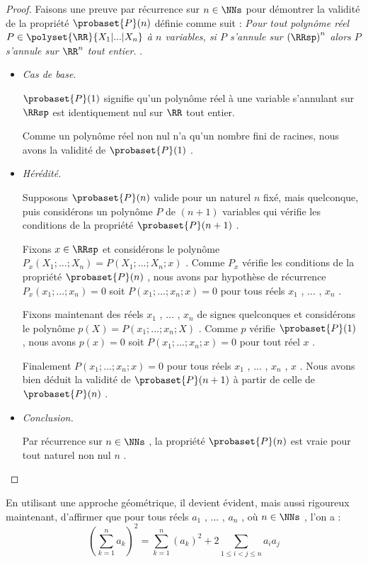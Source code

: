 \begin{proof}
	Faisons une preuve par récurrence sur $n \in \NNs$ pour démontrer la validité de la propriété $\probaset{P}(n)$ définie comme suit :
	\emph{\og 
		Pour tout polynôme réel $P \in \polyset{\RR}{X_1 | ... | X_n}$ à $n$ variables,
		si $P$ s'annule sur $\left( \RRsp \right)^n$ alors $P$ s'annule sur $\RR^n$ tout entier. 
	\fg}.

	\begin{itemize}[label=\small\textbullet]
		\item \emph{Cas de base.}
	
		\noindent
		$\probaset{P}(1)$ signifie qu'un polynôme réel à une variable s'annulant sur $\RRsp$ est identiquement nul sur $\RR$ tout entier.
		
		\smallskip
		\noindent
		Comme un polynôme réel non nul n'a qu'un nombre fini de racines, nous avons la validité de $\probaset{P}(1)$ .


		\medskip
		\item \emph{Hérédité.}
	
		\noindent
		Supposons $\probaset{P}(n)$ valide pour un naturel $n$ fixé, mais quelconque, puis considérons un polynôme $P$ de $(n + 1)$ variables qui vérifie les conditions de la propriété $\probaset{P}(n + 1)$ .
	
		\smallskip
		\noindent
		Fixons $x \in \RRsp$ et considérons le polynôme $P_x(X_1 ; ... ; X_n) = P(X_1 ; ... ; X_n ; x)$ .
		Comme $P_x$  vérifie les conditions de la propriété $\probaset{P}(n)$ ,
		nous avons par hypothèse de récurrence 
		$P_x(x_1 ; ... ; x_n) = 0$ soit $P(x_1 ; ... ; x_n ; x) = 0$ pour tous réels $x_1$ , ... , $x_n$ .
	
		\smallskip
		\noindent
		Fixons maintenant des réels $x_1$ , ... , $x_n$ de signes quelconques et considérons le polynôme $p(X) = P(x_1 ; ... ; x_n ; X)$ .
		Comme $p$ vérifie $\probaset{P}(1)$ , nous avons $p(x) = 0$ soit $P(x_1 ; ... ; x_n ; x) = 0$ pour tout réel $x$ .
	
		\smallskip
		\noindent
		Finalement $P(x_1 ; ... ; x_n ; x) = 0$ pour tous réels $x_1$ , ... , $x_n$ , $x$ .
		Nous avons bien déduit la validité de $\probaset{P}(n+1)$ à partir de celle de $\probaset{P}(n)$ .


	\medskip
	\item \emph{Conclusion.}
	
	\smallskip
	\noindent
	Par récurrence sur $n \in \NNs$ , la propriété $\probaset{P}(n)$ est vraie pour tout naturel non nul $n$ .
	\end{itemize} 

\end{proof}




\begin{remark*}
	En utilisant une approche géométrique, il devient évident, mais aussi rigoureux maintenant, d'affirmer que pour tous réels $a_1$ , ... , $a_n$ , où $n \in \NNs$ , l'on a :
\[
	\left( \sum_{k=1}^{n}a_k \right)^2
	=
	\sum_{k=1}^{n} \left( a_k \right)^2
	+
	2 \sum_{1 \leq i < j \leq n} a_i a_j
\]
\end{remark*}
